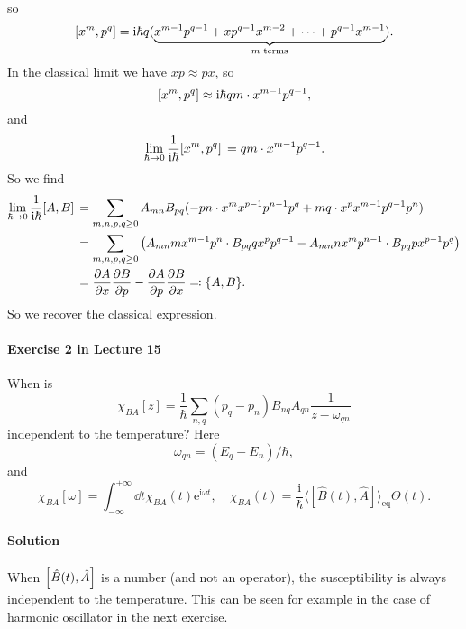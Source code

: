 \documentclass[hyperref, a4paper]{article}
\newcommand*{\ii}{\mathrm{i}}
\begin{document}
so 
\begin{equation}
    \comm{x^m}{p^q} = \ii \hbar q ( \underbrace{x^{m-1} p^{q-1} + x p^{q-1} x^{m-2} + \cdots + p^{q-1} x^{m-1}}_{\text{$m$ terms}} ).
\end{equation}
In the classical limit we have $xp \approx px$, so 
\[
    \comm{x^m}{p^q} \approx \ii \hbar q m \cdot x^{m-1} p^{q-1},
\]
and 
\begin{equation}
    \lim_{\hbar \to 0} \frac{1}{\ii \hbar} \comm*{x^m}{p^q} = qm \cdot x^{m-1} p^{q-1}.
\end{equation}
So we find 
\begin{equation}
    \begin{aligned}
        \lim_{\hbar \to 0} \frac{1}{\ii \hbar} \comm*{A}{B} 
        &= \sum_{m, n, p, q \geq 0} A_{mn} B_{pq} 
        ( - pn \cdot x^{m} x^{p-1} p^{n-1} p^q + mq \cdot x^p x^{m-1} p^{q-1} p^n ) \\
        &= \sum_{m, n, p, q \geq 0} \left(
            A_{mn} m x^{m-1} p^n \cdot B_{pq} q x^p p^{q-1}
            - A_{mn} n x^m p^{n-1} \cdot B_{pq} p x^{p-1} p^{q}
        \right) \\
        &= \pdv{A}{x} \pdv{B}{p} - \pdv{A}{p} \pdv{B}{x} \eqqcolon \{ A, B \}.
    \end{aligned}
\end{equation}
So we recover the classical expression.

\paragraph{Exercise 2 in Lecture 15} When is 
\begin{equation}
    \chi_{B A}[z]=\frac{1}{\hbar} \sum_{n, q}\left(p_q-p_n\right) B_{n q} A_{q n} \frac{1}{z-\omega_{q n}}
\end{equation}
independent to the temperature?
Here 
\begin{equation}
    \omega_{q n}=\left(E_q-E_n\right) / \hbar,
\end{equation}
and 
\begin{equation}
    \chi_{B A}[\omega]=\int_{-\infty}^{+\infty} \dd t \chi_{B A}(t) \mathrm{e}^{\ii \omega t}, \quad 
    \chi_{B A}(t)=\frac{\ii}{\hbar}\langle[\hat{B}(t), \hat{A}]\rangle_\text{eq} \Theta(t).
\end{equation}

\paragraph{Solution} When $\comm{\hat{B}(t)}{\hat{A}}$ is a number (and not an operator),
the susceptibility is always independent to the temperature.
This can be seen for example in the case of harmonic oscillator
in the next exercise.
\end{document}
